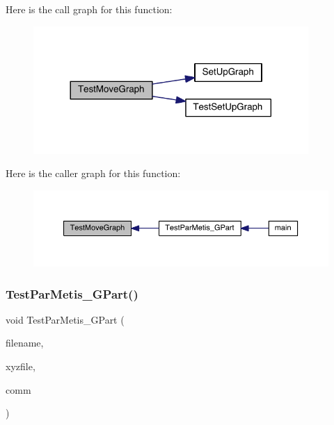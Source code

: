 Here is the call graph for this function\+:\nopagebreak
\begin{figure}[H]
\begin{center}
\leavevmode
\includegraphics[width=296pt]{a00437_a136ad3b21ef4f877c3100a997814e8ce_cgraph}
\end{center}
\end{figure}
Here is the caller graph for this function\+:\nopagebreak
\begin{figure}[H]
\begin{center}
\leavevmode
\includegraphics[width=350pt]{a00437_a136ad3b21ef4f877c3100a997814e8ce_icgraph}
\end{center}
\end{figure}
\mbox{\label{a00437_adb0c2dc0c5138f35c71739328c702074}} 
\subsubsection{\texorpdfstring{Test\+Par\+Metis\+\_\+\+G\+Part()}{TestParMetis\_GPart()}}
{\footnotesize\ttfamily void Test\+Par\+Metis\+\_\+\+G\+Part (\begin{DoxyParamCaption}\item[{char $\ast$}]{filename,  }\item[{char $\ast$}]{xyzfile,  }\item[{M\+P\+I\+\_\+\+Comm}]{comm }\end{DoxyParamCaption})}


